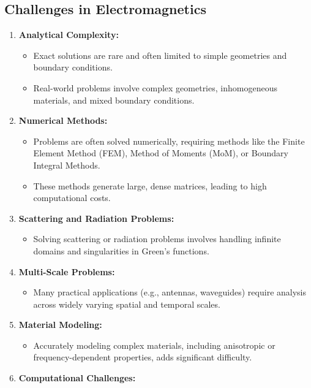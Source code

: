 \documentclass[12pt]{article}
\begin{document}
\subsection{Challenges in Electromagnetics}
\begin{enumerate}
    \item \textbf{Analytical Complexity:}
          \begin{itemize}
              \item Exact solutions are rare and often limited to simple geometries and boundary conditions.
              \item Real-world problems involve complex geometries, inhomogeneous materials, and mixed boundary conditions.
          \end{itemize}
    \item \textbf{Numerical Methods:}
          \begin{itemize}
              \item Problems are often solved numerically, requiring methods like the Finite Element Method (FEM), Method of Moments (MoM), or Boundary Integral Methods.
              \item These methods generate large, dense matrices, leading to high computational costs.
          \end{itemize}
    \item \textbf{Scattering and Radiation Problems:}
          \begin{itemize}
              \item Solving scattering or radiation problems involves handling infinite domains and singularities in Green's functions.
          \end{itemize}
    \item \textbf{Multi-Scale Problems:}
          \begin{itemize}
              \item Many practical applications (e.g., antennas, waveguides) require analysis across widely varying spatial and temporal scales.
          \end{itemize}
    \item \textbf{Material Modeling:}
          \begin{itemize}
              \item Accurately modeling complex materials, including anisotropic or frequency-dependent properties, adds significant difficulty.
          \end{itemize}
    \item \textbf{Computational Challenges:}

\end{enumerate}
\end{document}
